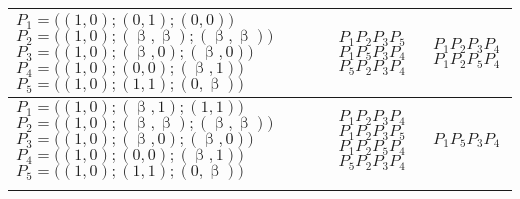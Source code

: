 \begin{table}[H]
\begin{tabular}{m{4.5cm}m{2.7cm}m{2.7cm}}
$P_1 = \bigl((1,0);(0,1);(0,0)\bigr)$\newline
$P_2 = \bigl((1,0);(\upbeta,\upbeta);(\upbeta,\upbeta)\bigr)$\newline
$P_3 = \bigl((1,0);(\upbeta,0);(\upbeta,0)\bigr)$\newline
$P_4 = \bigl((1,0);(0,0);(\upbeta,1)\bigr)$\newline
$P_5 = \bigl((1,0);(1,1);(0,\upbeta)\bigr)$      &
                                  $P_1P_2P_3P_5$\newline
                                  $P_1P_5P_3P_4$\newline
                                  $P_5P_2P_3P_4$&
                                                          $P_1P_2P_3P_4$\newline
                                                          $P_1P_2P_5P_4$\\

\midrule
$P_1 = \bigl((1,0);(\upbeta,1);(1,1)\bigr)$\newline
$P_2 = \bigl((1,0);(\upbeta,\upbeta);(\upbeta,\upbeta)\bigr)$\newline
$P_3 = \bigl((1,0);(\upbeta,0);(\upbeta,0)\bigr)$\newline
$P_4 = \bigl((1,0);(0,0);(\upbeta,1)\bigr)$\newline
$P_5 = \bigl((1,0);(1,1);(0,\upbeta)\bigr)$      &
                                  $P_1P_2P_3P_4$\newline
                                  $P_1P_2P_3P_5$\newline
                                  $P_1P_2P_5P_4$\newline
                                  $P_5P_2P_3P_4$&
                                                            $P_1P_5P_3P_4$\\ \bottomrule\\
\end{tabular}
\end{table}
